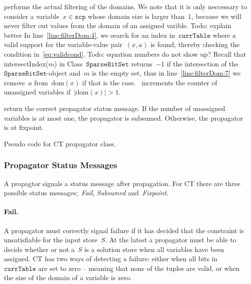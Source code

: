 \documentclass[a4paper,11pt]{article}
\newcommand{\Todo}[1]{{\color{blue}Todo: #1}}
\newcommand{\Dom}[1]{\text{dom}({#1})}
\newcommand{\SparseBitSet}{\texttt{SparseBitSet}}
\newcommand{\Scp}{\texttt{scp}}
\newcommand{\CurrTable}{\texttt{currTable}}
\begin{document}
\begin{enumerate}
   performs the
  actual filtering of the domains. We note that it is only neccessary to
  consider a variable~$x \in \Scp$ whose domain size is larger than~$1$,
  because we will never filter out values from the domain of an assigned
  varible. \Todo{explain better}
  In line~\ref{line:filterDom:4}, we search for an index in~$\CurrTable$
  where a valid support for the variable-value pair~$(x,a)$ is found, 
  thereby checking the condition in~\ref{eq:validcond}.
  \Todo{equation numbers do not show up?}
  Recall that intersectIndex($m$) in Class~$\SparseBitSet$ returns~$-1$ if
  the intersection of the~$\SparseBitSet$-object and~$m$ is the empty set,
  thus in line~\ref{line:filterDom:7} we remove~$a$ from~$\Dom{x}$ if that
  is the case.~ increments the
  counter of unassigned variables if~$|\Dom{x}| > 1$.

   return the correct
  propagator status message. If the number of unassigned variables is
  at most one, the propagator is subsumed. Otherwise, the propagator
  is at fixpoint.
  
\end{enumerate}


 \begin{algorithm}[h]
  \begin{algorithmic}[1]  %
    
    \end{algorithmic}
  \caption{Pseudo code for CT propagator class.}
  \label{algo:CT}
\end{algorithm}

\subsubsection{Propagator Status Messages}
A propagtor signals a status message after propagation.
For CT there are three possible status messages;~\emph{Fail},
\emph{Subsumed} and~\emph{Fixpoint}.

\paragraph{Fail.}
A propagator must correctly signal failure
if it has decided that the constraint is unsatisfiable for the input store~$S$.
At the latest a propagator must be
able to decide whether or not a~$S$ is a solution store when all
variables have been assigned.
CT has two ways of detecting a failure: either when all bits in~$\CurrTable$
are set to zero -- meaning that none of the tuples are valid, or when the
size of the domain of a variable is zero.
\end{document}
